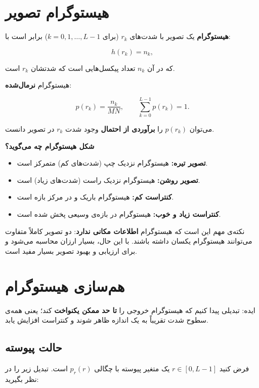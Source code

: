 \documentclass[11pt,a4paper]{article}
\begin{document}
	
	\section{هیستوگرام تصویر}
	
	\textbf{هیستوگرام} یک تصویر با شدت‌های $r_k$ (برای $k=0,1,\ldots,L-1$) برابر است با:
	
	\[
	h(r_k)=n_k,
	\]
	
	که در آن $n_k$ تعداد پیکسل‌هایی است که شدتشان $r_k$ است.
	
	هیستوگرام \textbf{نرمال‌شده}:
	
	\[
	p(r_k)=\frac{n_k}{MN},
	\qquad
	\sum_{k=0}^{L-1}p(r_k)=1.
	\]
	
	می‌توان $p(r_k)$ را \textbf{برآوردی از احتمال} وجود شدت $r_k$ در تصویر دانست.
	
	\textbf{شکل هیستوگرام چه می‌گوید؟}
	
	\begin{itemize}
		\item \textbf{تصویر تیره:} هیستوگرام نزدیک چپ (شدت‌های کم) متمرکز است.
		\item \textbf{تصویر روشن:} هیستوگرام نزدیک راست (شدت‌های زیاد) است.
		\item \textbf{کنتراست کم:} هیستوگرام باریک و در مرکز بازه است.
		\item \textbf{کنتراست زیاد و خوب:} هیستوگرام در بازه‌ی وسیعی پخش شده است.
	\end{itemize}
	
	نکته‌ی مهم این است که هیستوگرام \textbf{اطلاعات مکانی ندارد}: دو تصویر کاملاً متفاوت
	می‌توانند هیستوگرام یکسان داشته باشند. با این حال، بسیار ارزان محاسبه می‌شود
	و برای ارزیابی و بهبود تصویر بسیار مفید است.
	
	
	\section{هم‌سازی هیستوگرام}
	
	ایده: تبدیلی پیدا کنیم که هیستوگرام خروجی را \textbf{تا حد ممکن یکنواخت} کند؛
	یعنی همه‌ی سطوح شدت تقریباً به یک اندازه ظاهر شوند و کنتراست افزایش یابد.
	
	\subsection{حالت پیوسته}
	
	فرض کنید $r\in[0,L-1]$ یک متغیر پیوسته با چگالی $p_r(r)$ است. تبدیل زیر را در نظر بگیرید:
	
\end{document}
